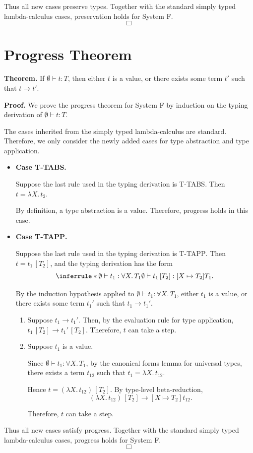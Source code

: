 \documentclass[nonacm]{acmart}
\begin{document}
Thus all new cases preserve types. Together with the standard simply typed lambda-calculus cases, preservation holds for System F.
\[
\Box
\]

\section{Progress Theorem}

\textbf{Theorem.}
If $\emptyset \vdash t : T$, then either $t$ is a value, or there exists some term $t'$ such that $t \longrightarrow t'$.

\textbf{Proof.}
We prove the progress theorem for System F by induction on the typing derivation of $\emptyset \vdash t : T$.

The cases inherited from the simply typed lambda-calculus are standard. Therefore, we only consider the newly added cases for type abstraction and type application.

\begin{itemize}
    \item \textbf{Case \textsc{T-TABS}.}

    Suppose the last rule used in the typing derivation is \textsc{T-TABS}. Then $t = \lambda X.\,t_2$.

    By definition, a type abstraction is a value. Therefore, progress holds in this case.

    \item \textbf{Case \textsc{T-TAPP}.}

    Suppose the last rule used in the typing derivation is \textsc{T-TAPP}. Then $t = t_1\,[T_2]$, and the typing derivation has the form
    \[
    \inferrule*
    {
      \emptyset \vdash t_1 : \forall X.\,T_1
    }
    {
      \emptyset \vdash t_1\,[T_2] : [X \mapsto T_2]T_1
    }.
    \]

    By the induction hypothesis applied to $\emptyset \vdash t_1 : \forall X.\,T_1$, either $t_1$ is a value, or there exists some term $t_1'$ such that $t_1 \longrightarrow t_1'$.

    \begin{enumerate}
        \item Suppose $t_1 \longrightarrow t_1'$. Then, by the evaluation rule for type application, $t_1\,[T_2] \longrightarrow t_1'\,[T_2]$. Therefore, $t$ can take a step.

        \item Suppose $t_1$ is a value.

        Since $\emptyset \vdash t_1 : \forall X.\,T_1$, by the canonical forms lemma for universal types, there exists a term $t_{12}$ such that $t_1 = \lambda X.\,t_{12}$.

        Hence $t = (\lambda X.\,t_{12})\,[T_2]$. By type-level beta-reduction,
        \[
        (\lambda X.\,t_{12})\,[T_2]
        \longrightarrow
        [X \mapsto T_2]t_{12}.
        \]

        Therefore, $t$ can take a step.
    \end{enumerate}
\end{itemize}

Thus all new cases satisfy progress. Together with the standard simply typed lambda-calculus cases, progress holds for System F.
\[
\Box
\]
\end{document}
